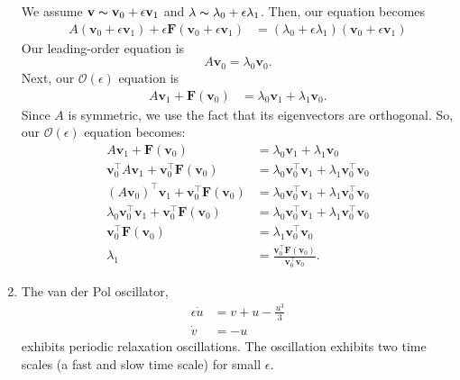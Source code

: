 \documentclass[10pt,letterpaper]{report}
\newcommand{\bvec}[1]{\mathbf{#1}}
\newcommand{\Ord}[1]{\mathcal{O}\left({#1}\right)}
\begin{document}
\begin{enumerate}
We assume $\bvec v \thicksim \bvec v_0 + \epsilon \bvec v_1$ and $\lambda \thicksim \lambda_0 + \epsilon \lambda_1$. Then, our equation becomes
\begin{align*}
    A(\bvec v_0 + \epsilon \bvec v_1) + \epsilon \bvec F(\bvec v_0 + \epsilon \bvec v_1) &= (\lambda_0 + \epsilon \lambda_1) (\bvec v_0 + \epsilon \bvec v_1)
\end{align*}
Our leading-order equation is
\[
A\bvec v_0 = \lambda_0 \bvec v_0.
\]
Next, our $\Ord{\epsilon}$ equation is
\begin{align*}
    A\bvec v_1 + \bvec F(\bvec v_0) &= \lambda_0 \bvec v_1 + \lambda_1 \bvec v_0.
\end{align*}
Since $A$ is symmetric, we use the fact that its eigenvectors are orthogonal. So, our $\Ord{\epsilon}$ equation becomes:
\begin{align*}
    A\bvec v_1 + \bvec F(\bvec v_0) &= \lambda_0 \bvec v_1 + \lambda_1 \bvec v_0
    \\
    \bvec v_0^\intercal A\bvec v_1 + \bvec v_0^\intercal \bvec F(\bvec v_0) &= \lambda_0 \bvec v_0^\intercal \bvec v_1 + \lambda_1 \bvec v_0^\intercal \bvec v_0 \\
    \left(A \bvec v_0\right)^\intercal \bvec v_1 + \bvec v_0^\intercal \bvec F(\bvec v_0) &= \lambda_0 \bvec v_0^\intercal \bvec v_1 + \lambda_1 \bvec v_0^\intercal \bvec v_0
    \\
    \lambda_0 \bvec v_0^\intercal \bvec v_1 + \bvec v_0^\intercal \bvec F(\bvec v_0) &= \lambda_0 \bvec v_0^\intercal \bvec v_1 + \lambda_1 \bvec v_0^\intercal \bvec v_0
    \\
    \bvec v_0^\intercal \bvec F(\bvec v_0) &= \lambda_1 \bvec v_0^\intercal \bvec v_0
    \\
    \lambda_1 &= \frac{\bvec v_0^\intercal \bvec F(\bvec v_0)}{\bvec v_0^\intercal \bvec v_0}.
\end{align*}

\item \begin{qbox}
The van der Pol oscillator,
\begin{align*}
    \epsilon \dot u &= v + u - \frac{u^3}{3} \\
    \dot v &= - u
\end{align*}
exhibits periodic relaxation oscillations. The oscillation exhibits two time scales (a fast and slow time scale) for small $\epsilon$.


\end{qbox}
\end{enumerate}
\end{document}
